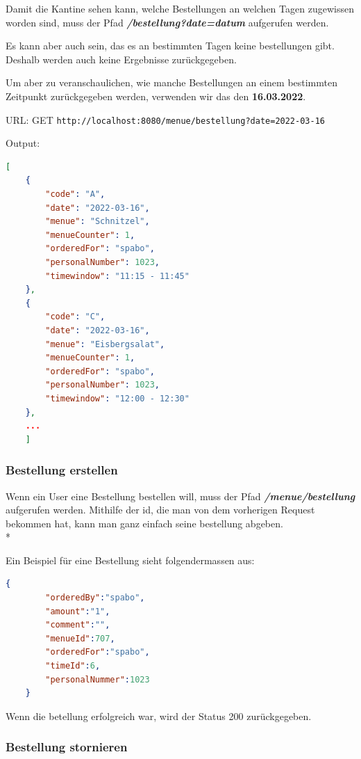 Damit die Kantine sehen kann, welche Bestellungen an welchen Tagen zugewissen worden sind, muss der Pfad \textbf{\textit{/bestellung?date=datum}} aufgerufen werden.

Es kann aber auch sein, das es an bestimmten Tagen keine bestellungen gibt. Deshalb werden auch keine Ergebnisse zurückgegeben.

Um aber zu veranschaulichen, wie manche Bestellungen an einem bestimmten Zeitpunkt zurückgegeben werden, verwenden wir das den \textbf{16.03.2022}.

URL: GET \colorbox{white}{\lstinline[basicstyle=\ttfamily\color{black},language=html]|http://localhost:8080/menue/bestellung?date=2022-03-16|}

Output:

\begin{lstlisting}[language=json,firstnumber=1]
[
    {
        "code": "A",
        "date": "2022-03-16",
        "menue": "Schnitzel",
        "menueCounter": 1,
        "orderedFor": "spabo",
        "personalNumber": 1023,
        "timewindow": "11:15 - 11:45"
    },
    {
        "code": "C",
        "date": "2022-03-16",
        "menue": "Eisbergsalat",
        "menueCounter": 1,
        "orderedFor": "spabo",
        "personalNumber": 1023,
        "timewindow": "12:00 - 12:30"
    },
    ...
    ]
\end{lstlisting}


\subsubsection{Bestellung erstellen}

Wenn ein User eine Bestellung bestellen will, muss der Pfad \textbf{\textit{/menue/bestellung}} aufgerufen werden. 
Mithilfe der id, die man von dem vorherigen Request bekommen hat, kann man ganz einfach seine bestellung abgeben. \\*

Ein Beispiel für eine Bestellung sieht folgendermassen aus:

\begin{lstlisting}[language=json,firstnumber=1]
    {
        "orderedBy":"spabo",
        "amount":"1",
        "comment":"",
        "menueId":707,
        "orderedFor":"spabo",
        "timeId":6,
        "personalNummer":1023
    }
\end{lstlisting}

Wenn die betellung erfolgreich war, wird der Status 200 zurückgegeben.


\subsubsection{Bestellung stornieren}

